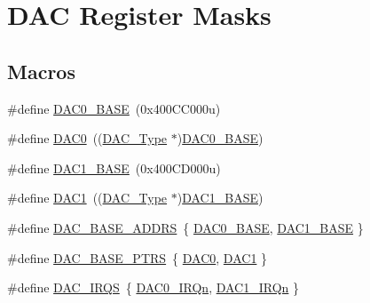 \hypertarget{group___d_a_c___register___masks}{}\section{D\+AC Register Masks}
\label{group___d_a_c___register___masks}
\subsection*{Macros}
\begin{DoxyCompactItemize}
\item 
\#define \mbox{\hyperlink{group___d_a_c___register___masks_gada12ca8452e773fd8f38041872934efc}{D\+A\+C0\+\_\+\+B\+A\+SE}}~(0x400\+C\+C000u)
\item 
\#define \mbox{\hyperlink{group___d_a_c___register___masks_gadfe0025fe66918c644e110c3b055c955}{D\+A\+C0}}~((\mbox{\hyperlink{struct_d_a_c___type}{D\+A\+C\+\_\+\+Type}} $\ast$)\mbox{\hyperlink{group___d_a_c___register___masks_gada12ca8452e773fd8f38041872934efc}{D\+A\+C0\+\_\+\+B\+A\+SE}})
\item 
\#define \mbox{\hyperlink{group___d_a_c___register___masks_ga3383b83a296ce0a5386a0d94195e8a99}{D\+A\+C1\+\_\+\+B\+A\+SE}}~(0x400\+C\+D000u)
\item 
\#define \mbox{\hyperlink{group___d_a_c___register___masks_gaffb5ff8779fa698f3c7165a617d56e4f}{D\+A\+C1}}~((\mbox{\hyperlink{struct_d_a_c___type}{D\+A\+C\+\_\+\+Type}} $\ast$)\mbox{\hyperlink{group___d_a_c___register___masks_ga3383b83a296ce0a5386a0d94195e8a99}{D\+A\+C1\+\_\+\+B\+A\+SE}})
\item 
\#define \mbox{\hyperlink{group___d_a_c___register___masks_ga2e056d497cd21aa7a51e188e005e9b37}{D\+A\+C\+\_\+\+B\+A\+S\+E\+\_\+\+A\+D\+D\+RS}}~\{ \mbox{\hyperlink{group___d_a_c___register___masks_gada12ca8452e773fd8f38041872934efc}{D\+A\+C0\+\_\+\+B\+A\+SE}}, \mbox{\hyperlink{group___d_a_c___register___masks_ga3383b83a296ce0a5386a0d94195e8a99}{D\+A\+C1\+\_\+\+B\+A\+SE}} \}
\item 
\#define \mbox{\hyperlink{group___d_a_c___register___masks_gab47690040e4d63adc4f324358c27157a}{D\+A\+C\+\_\+\+B\+A\+S\+E\+\_\+\+P\+T\+RS}}~\{ \mbox{\hyperlink{group___d_a_c___register___masks_gadfe0025fe66918c644e110c3b055c955}{D\+A\+C0}}, \mbox{\hyperlink{group___d_a_c___register___masks_gaffb5ff8779fa698f3c7165a617d56e4f}{D\+A\+C1}} \}
\item 
\#define \mbox{\hyperlink{group___d_a_c___register___masks_gac003cc87c636841f96fbf9084f536c43}{D\+A\+C\+\_\+\+I\+R\+QS}}~\{ \mbox{\hyperlink{group___interrupt__vector__numbers_gga666eb0caeb12ec0e281415592ae89083a6029e7bffa10f584e060a5448a456927}{D\+A\+C0\+\_\+\+I\+R\+Qn}}, \mbox{\hyperlink{group___interrupt__vector__numbers_gga666eb0caeb12ec0e281415592ae89083af10966fc3931d5e75c0b53bf8eacf84e}{D\+A\+C1\+\_\+\+I\+R\+Qn}} \}
\end{DoxyCompactItemize}
